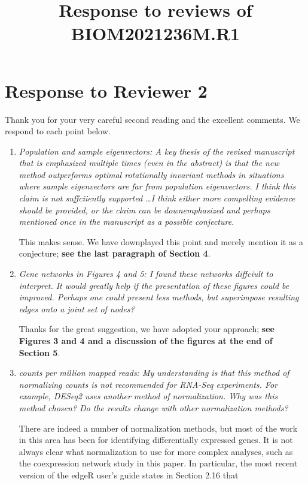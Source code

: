 \documentclass[12pt]{article}
\title{Response to reviews of BIOM2021236M.R1}
\author{}
\date{}
\begin{document}
\maketitle

\section{Response to Reviewer 2}

Thank you for your very careful second reading and the excellent comments. We respond to each point below.

\begin{enumerate}
\item \emph{Population and sample eigenvectors: A key thesis of the revised manuscript that is emphasized multiple times (even in the abstract) is that the new method outperforms optimal rotationally invariant methods in situations where sample eigenvectors are far from population eigenvectors. I think this claim is not suffciiently supported \ldots I think either more compelling evidence should be provided, or the claim can be downemphasized and perhaps mentioned once in the manuscript as a possible conjecture.}

  This makes sense. We have downplayed this point and merely mention it as a conjecture; \textbf{see the last paragraph of Section 4}.

\item \emph{Gene networks in Figures 4 and 5: I found these networks diffciult to interpret. It would greatly help if the presentation of these figures could be improved. Perhaps one could present less methods, but superimpose resulting edges onto a joint set of nodes?}

  Thanks for the great suggestion, we have adopted your approach; \textbf{see Figures 3 and 4 and a discussion of the figures at the end of Section 5}.

\item \emph{counts per million mapped reads: My understanding is that this method of normalizing counts is not recommended for RNA-Seq experiments. For example, DESeq2 uses another method of normalization. Why was this method chosen? Do the results change with other normalization methods? }

  There are indeed a number of normalization methods, but most of the work in this area has been for identifying differentially expressed genes. It is not always clear what normalization to use for more complex analyses, such as the coexpression network study in this paper. In particular, the most recent version of the edgeR user's guide states in Section 2.16 that


\end{enumerate}
\end{document}
